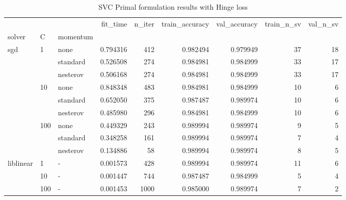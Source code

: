 \begin{table}[H]
\centering
\caption{SVC Primal formulation results with Hinge loss}
\label{primal_svc_hinge_cv_results}
\begin{tabular}{lllrrrrrr}
\toprule
          &     &   &  fit\_time &  n\_iter &  train\_accuracy &  val\_accuracy &  train\_n\_sv &  val\_n\_sv \\
solver & C & momentum &           &         &                 &               &             &           \\
\midrule
sgd & 1   & none &  0.794316 &     412 &        0.982494 &      0.979949 &          37 &        18 \\
          &     & standard &  0.526508 &     274 &        0.984981 &      0.984999 &          33 &        17 \\
          &     & nesterov &  0.506168 &     274 &        0.984981 &      0.984999 &          33 &        17 \\
          & 10  & none &  0.848348 &     483 &        0.984981 &      0.984999 &          10 &         6 \\
          &     & standard &  0.652050 &     375 &        0.987487 &      0.989974 &          10 &         6 \\
          &     & nesterov &  0.485980 &     296 &        0.984981 &      0.984999 &          10 &         6 \\
          & 100 & none &  0.449329 &     243 &        0.989994 &      0.989974 &           9 &         5 \\
          &     & standard &  0.348258 &     161 &        0.989994 &      0.989974 &           7 &         4 \\
          &     & nesterov &  0.134886 &      58 &        0.989994 &      0.989974 &           8 &         5 \\
liblinear & 1   & - &  0.001573 &     428 &        0.989994 &      0.989974 &          11 &         6 \\
          & 10  & - &  0.001447 &     744 &        0.987487 &      0.984999 &           5 &         4 \\
          & 100 & - &  0.001453 &    1000 &        0.985000 &      0.989974 &           7 &         2 \\
\bottomrule
\end{tabular}
\end{table}
